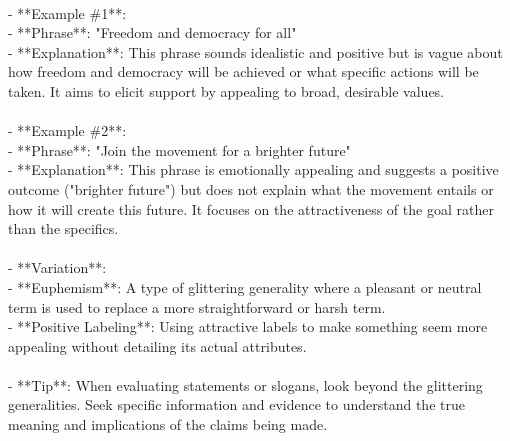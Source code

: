\documentclass[a4paper,12pt,single,pdftex]{scrartcl}
\begin{document}
    
      
    \\

    
      - **Example \#1**:
    \\

    
        - **Phrase**: "Freedom and democracy for all"
    \\

    
        - **Explanation**: This phrase sounds idealistic and positive but is vague about how freedom and democracy will be achieved or what specific actions will be taken. It aims to elicit support by appealing to broad, desirable values.
    \\

    
      
    \\

    
      - **Example \#2**:
    \\

    
        - **Phrase**: "Join the movement for a brighter future"
    \\

    
        - **Explanation**: This phrase is emotionally appealing and suggests a positive outcome ("brighter future") but does not explain what the movement entails or how it will create this future. It focuses on the attractiveness of the goal rather than the specifics.
    \\

    
      
    \\

    
      - **Variation**:
    \\

    
        - **Euphemism**: A type of glittering generality where a pleasant or neutral term is used to replace a more straightforward or harsh term.
    \\

    
        - **Positive Labeling**: Using attractive labels to make something seem more appealing without detailing its actual attributes.
    \\

    
      
    \\

    
      - **Tip**: When evaluating statements or slogans, look beyond the glittering generalities. Seek specific information and evidence to understand the true meaning and implications of the claims being made.
    \\
\end{document}

